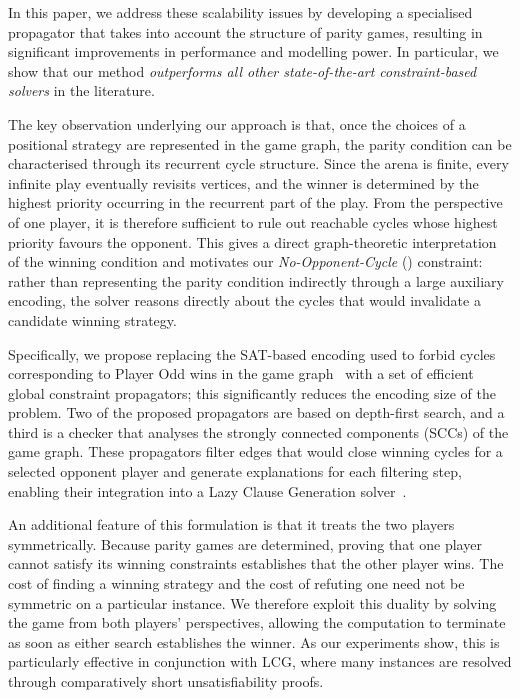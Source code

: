 \documentclass[a4paper,fleqn]{cas-sc}
\begin{document}
In this paper, we address these scalability issues by developing a specialised propagator that takes into account the structure of parity games, resulting in significant improvements in performance and modelling power. 
In particular, we show that our method {\em outperforms all other state-of-the-art constraint-based solvers} in the literature. 

The key observation underlying our approach is that, once the choices of a
positional strategy are represented in the game graph, the parity condition
can be characterised through its recurrent cycle structure. Since the arena
is finite, every infinite play eventually revisits vertices, and the winner
is determined by the highest priority occurring in the recurrent part of the
play. From the perspective of one player, it is therefore sufficient to rule
out reachable cycles whose highest priority favours the opponent. This gives
a direct graph-theoretic interpretation of the winning condition and motivates
our \emph{No-Opponent-Cycle} (\noc) constraint: rather than representing the
parity condition indirectly through a large auxiliary encoding, the solver
reasons directly about the cycles that would invalidate a candidate winning
strategy.

Specifically, we propose replacing the SAT-based encoding used to forbid cycles corresponding to Player Odd wins in the game graph~\citep{Heljanko:2012} with a set of efficient global constraint propagators; this significantly reduces the encoding size of the problem. Two of the proposed propagators are based on depth-first search, and a third is a checker that analyses the strongly connected components (SCCs) of the game graph. These propagators filter edges that would close winning cycles for a selected opponent player and generate explanations for each filtering step, enabling their integration into a Lazy Clause Generation solver~\citep{DBLP:journals/constraints/OhrimenkoSC09}.

An additional feature of this formulation is that it treats the two players
symmetrically. Because parity games are determined, proving that one player
cannot satisfy its winning constraints establishes that the other player
wins. The cost of finding a winning strategy and the cost of refuting one
need not be symmetric on a particular instance. We therefore exploit this
duality by solving the game from both players' perspectives, allowing the
computation to terminate as soon as either search establishes the winner.
As our experiments show, this is particularly effective in conjunction with
LCG, where many instances are resolved through comparatively short
unsatisfiability proofs.
\end{document}

